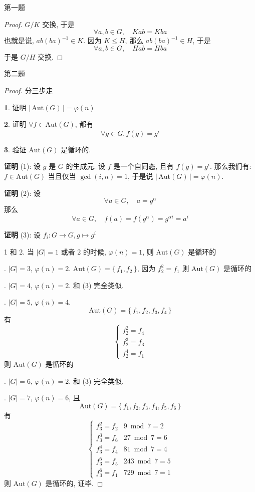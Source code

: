 \documentclass[12pt]{ctexart}
\theoremstyle{definition}
\theoremstyle{remark}
\begin{document}
\noindent 第一题
\begin{proof}
\(G/ K\) 交换, 于是
\[
\forall a , b \in G , \quad K a b = K ba 
\]
也就是说, \( a b ( b a ) ^{-1} \in K\). 因为 \(K \le H\), 那么
\( a b (ba) ^{-1} \in H\), 于是
\[
\forall a , b \in G, \quad H ab = H ba
\]
于是 \(G / H\) 交换.
\end{proof}

\newpage
\noindent 第二题
\begin{proof}
分三步走

\medskip%
	\noindent \textbf{1}. 证明 \(\vert\, \text{Aut}(G) \,\vert = \varphi (n)\)

\smallskip%
	\noindent \textbf{2}. 证明 \(\forall f \in \text{Aut} (G)\), 都有
	\[
		\forall g\in G, f (g) = g ^{i}
	\]

\smallskip%
	\noindent \textbf{3}. 验证 \(\text{Aut}(G)\) 是循环的.
\medskip

\noindent \textbf{证明} (1): 
	设 \(g\) 是 \(G\) 的生成元. 设 \(f\) 是一个自同态, 且有 \(f (g) = g^{i}\). 那么我们有: \(f \in \text{Aut}(G)\) 当且仅当 \( \gcd (i, n ) = 1\), 于是说 \( \vert \, \text{Aut} (G) \,\vert = \varphi (n)\). 

	\bigskip
\noindent \textbf{证明} (2): 
	设
	\[
	\forall a\in G, \quad a = g ^{\alpha}
	\]
	那么
	\[
	\forall a \in G, \quad f(a) = f (g ^{\alpha} ) = g^{\alpha i} = a ^{i}
	\]

	\bigskip
\noindent \textbf{证明} (3):
	设 \(f _{i} \colon G \to G, g \mapsto g ^{i}\)

	{
	\setlength{\parindent}{40pt}
	1 和 2. 当 \(\vert G \vert = 1\) 或者 2 的时候, \( \varphi (n) = 1\), 
	则 \(\text{Aut}(G)\) 是循环的

	. \(\vert G \vert = 3\), \( \varphi (n) = 2\). \(\text{Aut}(G) = \{ \, f_1, f_2 \, \}\), 因为 \(f_2 ^{2} = f_{1}\)
	则 \(\text{Aut}(G)\) 是循环的

	. \(\vert G \vert = 4\), \( \varphi (n ) = 2\). 和 (3) 完全类似. 

	. \(\vert G \vert = 5\), \( \varphi (n) = 4\). 
	\[
		\text{Aut}(G) = \{ \, f_1,f_2,f_3,f_4\, \}
	\]
	有
	\[
	\begin{cases}
	f_2^{2} = f_4\\
	f_2^{3} = f_3\\
	f_2^{4} = f_1
	\end{cases}
	\]
	则 \(\text{Aut}(G)\) 是循环的

	. \(\vert G \vert = 6\), \( \varphi (n) = 2\). 和 (3) 完全类似. 

	. \(\vert G \vert = 7\), \( \varphi (n) = 6\), 且
	\[
		\text{Aut}(G) = \{ \, f_1,f_2,f_3,f_4,f_5,f_6 \, \}
	\]
	有
	\[
	\begin{cases}
		f_{3} ^{2} = f_2 & 9 \bmod{7} = 2\\
		f_3^{3} = f _{6} & 27 \bmod{7} = 6\\
		f_3^{4} = f _{4} & 81 \bmod{7} = 4\\
		f_{3}^{5} = f_{5} & 243  \bmod{7} = 5 \\
		f_{3}^{6} = f_1 & 729 \bmod{7} = 1
	\end{cases}
	\]
	则 \(\text{Aut}(G)\) 是循环的, 证毕.
	}
\end{proof}
\end{document}
